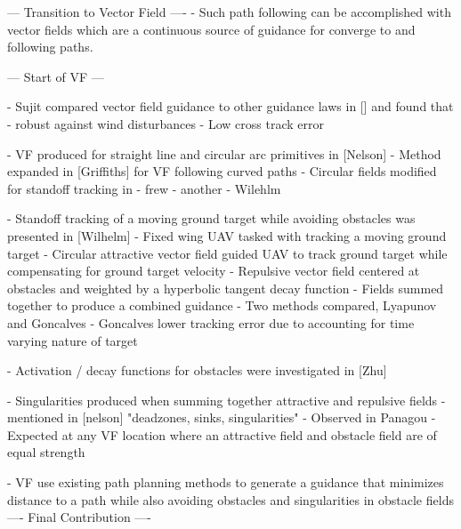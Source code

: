 \documentclass[conf]{new-aiaa}
\begin{document}
%
%
%
%
%



--- Transition to Vector Field ----
- Such path following can be accomplished with vector fields which are a continuous source of guidance for converge to and following paths.

--- Start of VF ---

- Sujit compared vector field guidance to other guidance laws in [] and found that
	- robust against wind disturbances
	- Low cross track error
	
- VF produced for straight line and circular arc primitives in [Nelson]
- Method expanded in [Griffiths] for VF following curved paths
- Circular fields modified for standoff tracking in 
	- frew
	- another
	- Wilehlm


- Standoff tracking of a moving ground target while avoiding obstacles was presented in [Wilhelm]
	- Fixed wing UAV tasked with tracking a moving ground target
    - Circular attractive vector field guided UAV to track ground target while compensating for ground target velocity
    - Repulsive vector field centered at obstacles and weighted by a hyperbolic tangent decay function
    - Fields summed together to produce a combined guidance
    - Two methods compared, Lyapunov and Goncalves
    - Goncalves lower tracking error due to accounting for time varying nature of target
    

- Activation / decay functions for obstacles were investigated in [Zhu]

- Singularities produced when summing together attractive and repulsive fields
	- mentioned in [nelson] "deadzones, sinks, singularities"
	- Observed in Panagou
	- Expected at any VF location where an attractive field and obstacle field are of equal strength

- VF use existing path planning methods to generate a guidance that minimizes distance to a path while also avoiding obstacles and singularities in obstacle fields
---- Final Contribution ----
\end{document}
